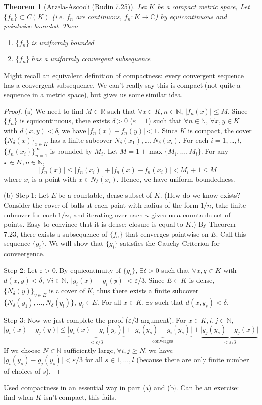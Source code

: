 \documentclass{article}
\theoremstyle{plain}
\newtheorem{theorem}{Theorem}
\theoremstyle{remark}
\newcommand{\N}{{\mathbb N}}
\newcommand{\R}{{\mathbb R}}
\newcommand{\C}{{\mathbb C}}
\newcommand{\ep}{{\varepsilon}}
\begin{document}
\begin{theorem}[Arzela-Ascooli (Rudin 7.25)]
	Let $K$ be a compact metric space,
	Let $\{f_n\} \subset C(K)$ (i.e. $f_n$ are continuous, $f_n \colon K \to \C$)
	by equicontinuous and pointwise bounded. Then
	\begin{enumerate}
		\item[(a)] $\{f_n\}$ is uniformly bounded
		\item[(b)] $\{f_n\}$ has a uniformly convergent subsequence
	\end{enumerate}
\end{theorem}
Might recall an equivalent definition of compactness:
every convergent sequence has a convergent subsequence.
We can't really say this is compact (not quite a sequence in a metric space),
but gives us some similar idea.

\begin{proof}
	(a) We need to find $M \in \R$ such that $\forall x \in K, n \in \N$,
	$\lvert f_n(x) \rvert \leq M$.
	Since $\{f_n\}$ is equicontinuous, there exists $\delta > 0$ ($\ep = 1$)
	such that $\forall n \in \N$, $\forall x,y \in K$ with $d(x,y) < \delta$,
	we have $\lvert f_n(x) - f_n(y) \rvert < 1$.
	Since $K$ is compact,
	the cover $\{N_\delta(x)\}_{x \in K}$ has a finite subcover
	$N_\delta(x_1),\dots,N_\delta(x_l)$.
	For each $i = 1,\dots,l$, $\{f_n(x_i)\}_{n=1}^\infty$ is bounded by $M_i$.
	Let $M = 1 + \max\{M_1,\dots,M_l\}$.
	For any $x \in K,n\in\N$,
	\[
		\lvert f_n(x) \rvert \leq
		\lvert f_n(x_i) \rvert + \lvert f_n(x) - f_n(x_i)\rvert
		< M_i + 1 \leq M
	\]
	where $x_i$ is a point with $x \in N_\delta(x_i)$.
	Hence, we have uniform boundedness.

	(b) Step 1: Let $E$ be a countable, dense subset of $K$.
	(How do we know exists?
	Consider the cover of balls at each point with radius of the form $1/n$,
	take finite subcover for each $1/n$, and iterating over each $n$
	gives us a countable set of points.
	Easy to convince that it is dense: closure is equal to $K$.)
	By Theorem 7.23, there exists a subsequence of $\{f_n\}$
	that converges pointwise on $E$.
	Call this sequence $\{g_i\}$.
	We will show that $\{g_i\}$ satisfies the Cauchy Criterion for conveergence.

	Step 2: Let $\ep > 0$. By equicontinuity of $\{g_i\}$,
	$\exists \delta > 0$ such that $\forall x,y \in K$ with $d(x,y) < \delta$,
	$\forall i \in \N$, $\lvert g_i(x) - g_i(y) \rvert < \ep/3$.
	Since $E \subset K$ is dense, $\{N_\delta(y)\}_{y \in E}$ is a cover of $K$,
	thus there exists a finite subcover $\{N_\delta(y_1),\dots,N_\delta(y_l)\}$, $y_i \in E$.
	For all $x \in K$, $\exists s$ such that $d(x,y_s) < \delta$.
	
	Step 3: Now we just complete the proof ($\ep/3$ argument).
	For $x \in K, i,j \in \N$,
	\[
		\lvert g_i(x) - g_j(y) \rvert \leq \underbrace{\lvert g_i(x) - g_i(y_s) \rvert}_{<\ep/3}
		+ \underbrace{\lvert g_i(y_s) - g_i(y_s)\rvert}_{\text{converges}}
		+ \underbrace{\lvert g_j(y_s) - g_j(x) \rvert}_{<\ep/3}
	\]
	If we choose $N \in \N$ sufficiently large,
	$\forall i,j \geq N$, we have $\lvert g_i(y_s) - g_j(y_s) \rvert < \ep/3$
	for all $s \in 1,\dots,l$
	(because there are only finite number of choices of $s$).
\end{proof}
Used compactness in an essential way in part (a) and (b).
Can be an exercise: find when $K$ isn't compact, this fails.
\end{document}
